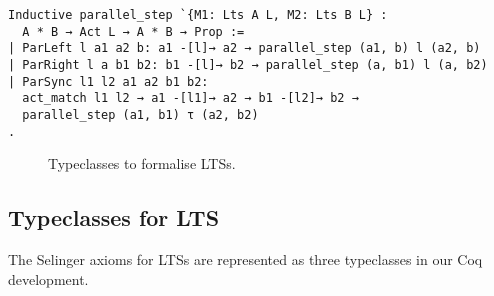 \begin{mdframed}
\begin{verbatim}
Inductive parallel_step `{M1: Lts A L, M2: Lts B L} :
  A * B → Act L → A * B → Prop :=
| ParLeft l a1 a2 b: a1 -[l]→ a2 → parallel_step (a1, b) l (a2, b)
| ParRight l a b1 b2: b1 -[l]→ b2 → parallel_step (a, b1) l (a, b2)
| ParSync l1 l2 a1 a2 b1 b2:
  act_match l1 l2 → a1 -[l1]→ a2 → b1 -[l2]→ b2 →
  parallel_step (a1, b1) τ (a2, b2)
.
\end{verbatim}
\end{mdframed}


\begin{figure}
  \hrulefill
\begin{center}
\end{center}
  \caption{Typeclasses to formalise LTSs.}
  \hrulefill
  \label{fig:structure-typeclasses-lts}
\end{figure}


\subsection{Typeclasses for LTS}
The Selinger axioms for LTSs are represented as three typeclasses in our Coq
development.

